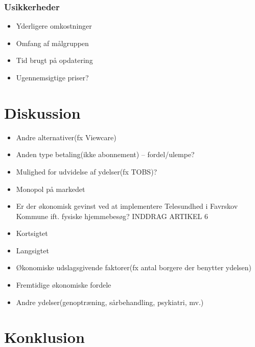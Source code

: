 \subsubsection{Usikkerheder}
\begin{itemize}
	\item Yderligere omkostninger
	\item Omfang af målgruppen
	\item Tid brugt på opdatering
	\item Ugennemsigtige priser?
\end{itemize}





\section{Diskussion}
\begin{itemize}
	\item Andre alternativer(fx Viewcare)
	\item Anden type betaling(ikke abonnement) – fordel/ulempe?
	\item Mulighed for udvidelse af ydelser(fx TOBS)? 
	\item Monopol på markedet
	\item Er der økonomisk gevinst ved at implementere Telesundhed i Favrskov Kommune ift. fysiske hjemmebesøg? INDDRAG ARTIKEL 6
	\item Kortsigtet
	\item Langsigtet
	\item Økonomiske udslagsgivende faktorer(fx antal borgere der benytter ydelsen)
	\item Fremtidige økonomiske fordele
	\item Andre ydelser(genoptræning, sårbehandling, psykiatri, mv.)
\end{itemize}
\section{Konklusion}